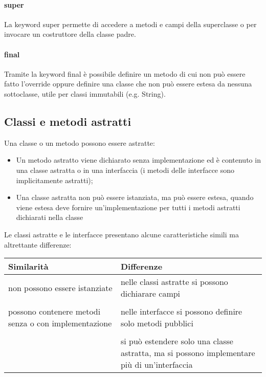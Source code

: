 \documentclass[a4paper,12pt,twoside]{book}
\begin{document}
\paragraph{super} La keyword super permette di accedere a metodi e
campi della superclasse o per invocare un costruttore della classe
padre.

\paragraph{final} Tramite la keyword final è possibile definire un
metodo di cui non può essere fatto l’override oppure definire una
classe che non può essere estesa da nessuna sottoclasse, utile per
classi immutabili (e.g. String).

\subsection{Classi e metodi astratti}

Una classe o un metodo possono essere
astratte:
\begin{itemize}
\item Un metodo astratto viene dichiarato senza implementazione ed è
  contenuto in una classe astratta o in una interfaccia (i metodi
  delle interfacce sono implicitamente astratti);
\item Una classe astratta non può essere istanziata, ma può essere
  estesa, quando viene estesa deve fornire un’implementazione per
  tutti i metodi astratti dichiarati nella classe
\end{itemize}

Le classi astratte e le interfacce presentano alcune caratteristiche
simili ma altrettante differenze:
\begin{table}[ht]
  \begin{tabularx}{\textwidth}{*{2}{X}} %
    \hline %
    Similarità & Differenze\\
    \hline %
    non possono essere istanziate                         & nelle
    classi astratte si possono dichiarare campi	\\
    &\\
    possono contenere metodi senza o con implementazione  & nelle
    interfacce si possono definire solo metodi pubblici\\
    &\\
    &       si può estendere solo una classe astratta, ma si
    possono implementare più di un’interfaccia                      \\
    \hline %
  \end{tabularx}
  \label{table:abstractInterface} %
\end{table}
\end{document}
